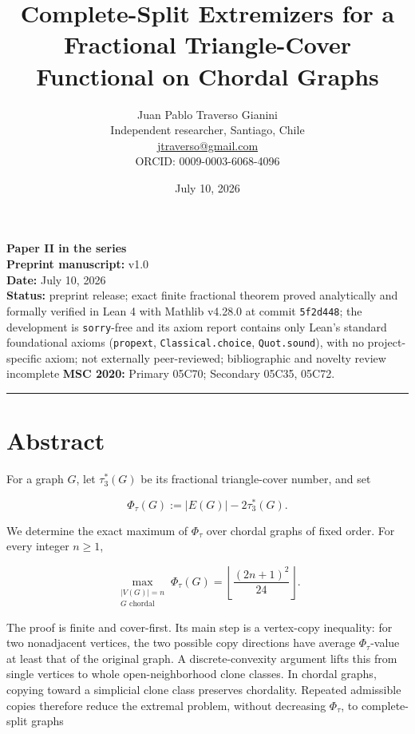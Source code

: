 \documentclass[
  11pt,
]{article}
\title{Complete-Split Extremizers for a Fractional Triangle-Cover Functional on Chordal Graphs}
\author{Juan Pablo Traverso Gianini\\
\small Independent researcher, Santiago, Chile\\
\small \href{mailto:jtraverso@gmail.com}{jtraverso@gmail.com}\\
\small ORCID: 0009-0003-6068-4096}
\date{July 10, 2026}
\begin{document}
\sloppy
\maketitle
\begin{small}\begin{raggedright}

\textbf{Paper II in the series}\\
\textbf{Preprint manuscript:} v1.0\\
\textbf{Date:} July 10, 2026\\
\textbf{Status:} preprint release; exact finite fractional theorem
proved analytically and formally verified in Lean 4 with Mathlib v4.28.0
at commit \texttt{5f2d448}; the development is \texttt{sorry}-free and
its axiom report contains only Lean's standard foundational axioms
(\texttt{propext}, \texttt{Classical.choice}, \texttt{Quot.sound}), with
no project-specific axiom; not externally peer-reviewed; bibliographic
and novelty review incomplete \textbf{MSC 2020:} Primary 05C70;
Secondary 05C35, 05C72.

\begin{center}\rule{0.5\linewidth}{0.5pt}\end{center}

\end{raggedright}\end{small}

\section{Abstract}\label{abstract}

For a graph \(G\), let \(\tau_3^*(G)\) be its fractional triangle-cover
number, and set

\[
\Phi_\tau(G):=|E(G)|-2\tau_3^*(G).
\]

We determine the exact maximum of \(\Phi_\tau\) over chordal graphs of
fixed order. For every integer \(n\ge1\),

\[
\boxed{
\max_{\substack{|V(G)|=n\\G\text{ chordal}}}
\Phi_\tau(G)
=
\left\lfloor\frac{(2n+1)^2}{24}\right\rfloor.
}
\]

The proof is finite and cover-first. Its main step is a vertex-copy
inequality: for two nonadjacent vertices, the two possible copy
directions have average \(\Phi_\tau\)-value at least that of the
original graph. A discrete-convexity argument lifts this from single
vertices to whole open-neighborhood clone classes. In chordal graphs,
copying toward a simplicial clone class preserves chordality. Repeated
admissible copies therefore reduce the extremal problem, without
decreasing \(\Phi_\tau\), to complete-split graphs
\end{document}
